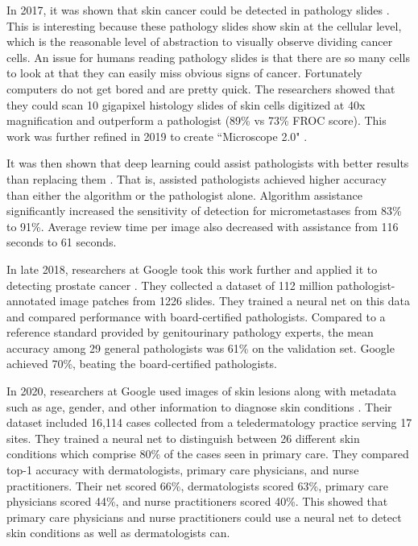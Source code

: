In 2017, it was shown that skin cancer could be detected in pathology slides \cite{liu2017detecting}.  This is interesting because these pathology slides show skin at the cellular level, which is the reasonable level of abstraction to visually observe dividing cancer cells.  An issue for humans reading pathology slides is that there are so many cells to look at that they can easily miss obvious signs of cancer.  Fortunately computers do not get bored and are pretty quick.  The researchers showed that they could scan 10 gigapixel histology slides of skin cells digitized at 40x magnification and outperform a pathologist (89\% vs 73\% FROC score).  This work was further refined in 2019 to create ``Microscope 2.0" \cite{chen2019augmented}.

It was then shown that deep learning could assist pathologists with better results than replacing them \cite{steiner2018impact}.  That is, assisted pathologists achieved higher accuracy than either the algorithm or the pathologist alone. Algorithm assistance significantly increased the sensitivity of detection for micrometastases from 83\% to 91\%. Average review time per image also decreased with assistance from 116 seconds to 61 seconds.

In late 2018, researchers at Google took this work further and applied it to detecting prostate cancer \cite{nagpal2019development}.  They collected a dataset of 112 million pathologist-annotated image patches from 1226 slides.  They trained a neural net on this data and compared performance with board-certified pathologists.  Compared to a reference standard provided by genitourinary pathology experts, the mean accuracy among 29 general pathologists was 61\% on the validation set. Google achieved 70\%, beating the board-certified pathologists.

In 2020, researchers at Google used images of skin lesions along with metadata such as age, gender, and other information to diagnose skin conditions \cite{liu2020deep}.  Their dataset included 16,114 cases collected from a teledermatology practice serving 17 sites.  They trained a neural net to distinguish between 26 different skin conditions which comprise 80\% of the cases seen in primary care.  They compared top-1 accuracy with dermatologists, primary care physicians, and nurse practitioners.  Their net scored 66\%, dermatologists scored 63\%, primary care physicians scored 44\%, and nurse practitioners scored 40\%.  This showed that primary care physicians and nurse practitioners could use a neural net to detect skin conditions as well as dermatologists can.

